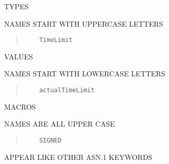 \begin{bwslide}

\begin{nrtc}
\item	TYPES
	\begin{nrtc}
	\item	NAMES START WITH UPPERCASE LETTERS
	\begin{quote}\small\begin{verbatim}
	TimeLimit
	\end{verbatim}\end{quote}
	\end{nrtc}
\item	VALUES
	\begin{nrtc}
	\item	NAMES START WITH LOWERCASE LETTERS
	\begin{quote}\small\begin{verbatim}
	actualTimeLimit
	\end{verbatim}\end{quote}
	\end{nrtc}
\item	MACROS
	\begin{nrtc}
	\item	NAMES ARE ALL UPPER CASE
	\begin{quote}\small\begin{verbatim}
	SIGNED
	\end{verbatim}\end{quote}
	\item	APPEAR LIKE OTHER ASN.1 KEYWORDS
	\end{nrtc}
\end{nrtc}
\end{bwslide}


%


